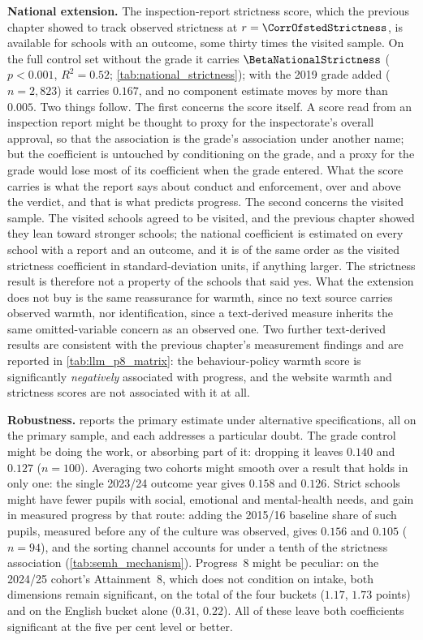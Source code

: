\textbf{National extension.} The inspection-report strictness score, which
the previous chapter showed to track observed strictness at
$r = \CorrOfstedStrictness$, is available for \NNationalStrictness{} schools
with an outcome, some thirty times the visited sample. On the full control set
without the grade it carries $\BetaNationalStrictness$ ($p < 0.001$,
$R^2 = 0.52$; \cref{tab:national_strictness}); with the 2019 grade added
($n = 2{,}823$) it carries $0.167$, and no component estimate moves by more
than $0.005$. Two things follow. The first concerns the score itself. A score
read from an inspection report might be thought to proxy for the
inspectorate's overall approval, so that the association is the grade's
association under another name; but the coefficient is untouched by
conditioning on the grade, and a proxy for the grade would lose most of its
coefficient when the grade entered. What the score carries is what the report
says about conduct and enforcement, over and above the verdict, and that is
what predicts progress. The second concerns the visited sample. The visited
schools agreed to be visited, and the previous chapter showed they lean
toward stronger schools; the national coefficient is estimated on every
school with a report and an outcome, and it is of the same order as the
visited strictness coefficient in standard-deviation units, if anything
larger. The strictness result is
therefore not a property of the schools that said yes. What the extension
does not buy is the same reassurance for warmth, since no text source carries
observed warmth, nor identification, since a text-derived measure inherits
the same omitted-variable concern as an observed one. Two further
text-derived results are consistent with the previous chapter's measurement
findings and are reported in \cref{tab:llm_p8_matrix}: the behaviour-policy
warmth score is significantly \emph{negatively} associated with progress, and
the website warmth and strictness scores are not associated with it at all.



\textbf{Robustness.}  reports the primary
estimate under alternative specifications, all on the primary sample, and
each addresses a particular doubt. The grade control might be doing the work,
or absorbing part of it: dropping it leaves $0.140$ and $0.127$ ($n = 100$).
Averaging two cohorts might smooth over a result that holds in only one:
the single 2023/24 outcome year gives $0.158$ and $0.126$. Strict schools
might have fewer pupils with social, emotional and mental-health needs, and
gain in measured progress by that route: adding the 2015/16 baseline share
of such pupils, measured before any of the culture was observed, gives
$0.156$ and $0.105$ ($n = 94$), and the sorting channel accounts for under a
tenth of the strictness association (\cref{tab:semh_mechanism}). Progress~8
might be peculiar: on the 2024/25 cohort's Attainment~8, which does not
condition on intake, both dimensions remain significant, on the total of the
four buckets ($1.17$, $1.73$ points) and on the English bucket alone ($0.31$,
$0.22$). All of these leave both coefficients significant at the five per
cent level or better.

